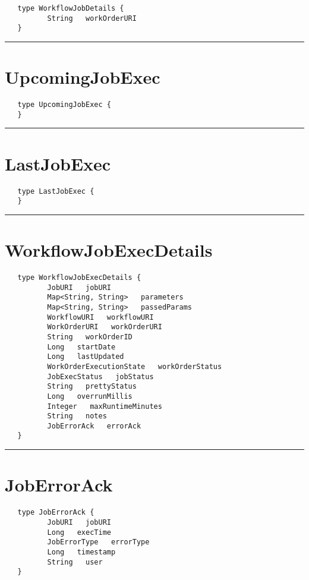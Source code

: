 \begin{Verbatim}
   type WorkflowJobDetails {
          String   workOrderURI
   }
\end{Verbatim}

\rule{12cm}{2pt}
\section{UpcomingJobExec}
\label{type:UpcomingJobExec}

\begin{Verbatim}
   type UpcomingJobExec {
   }
\end{Verbatim}

\rule{12cm}{2pt}
\section{LastJobExec}
\label{type:LastJobExec}

\begin{Verbatim}
   type LastJobExec {
   }
\end{Verbatim}

\rule{12cm}{2pt}
\section{WorkflowJobExecDetails}
\label{type:WorkflowJobExecDetails}

\begin{Verbatim}
   type WorkflowJobExecDetails {
          JobURI   jobURI
          Map<String, String>   parameters
          Map<String, String>   passedParams
          WorkflowURI   workflowURI
          WorkOrderURI   workOrderURI
          String   workOrderID
          Long   startDate
          Long   lastUpdated
          WorkOrderExecutionState   workOrderStatus
          JobExecStatus   jobStatus
          String   prettyStatus
          Long   overrunMillis
          Integer   maxRuntimeMinutes
          String   notes
          JobErrorAck   errorAck
   }
\end{Verbatim}

\rule{12cm}{2pt}
\section{JobErrorAck}
\label{type:JobErrorAck}

\begin{Verbatim}
   type JobErrorAck {
          JobURI   jobURI
          Long   execTime
          JobErrorType   errorType
          Long   timestamp
          String   user
   }
\end{Verbatim}


